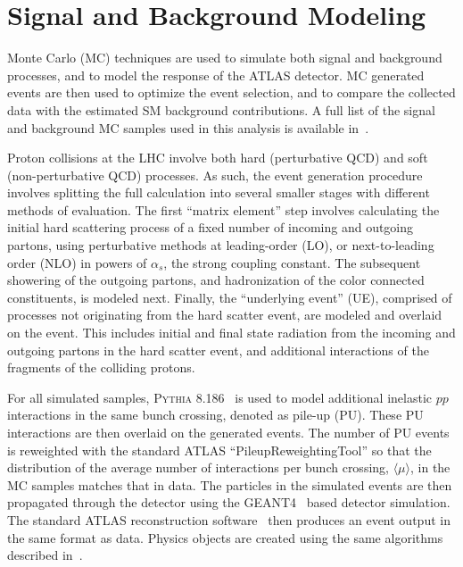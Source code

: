 %
\section{Signal and Background Modeling}
\label{ch:analysisStrategy:sig_bkg_model}
Monte Carlo (MC) techniques are used to simulate both signal and background processes, and to model the response of the ATLAS detector. MC generated events are then used to optimize the event selection, and to compare the collected data with the estimated SM background contributions. A full list of the signal and background MC samples used in this analysis is available in~\App{\ref{ch:samples}}.

Proton collisions at the LHC involve both hard (perturbative QCD) and soft (non-perturbative QCD) processes. As such, the event generation procedure involves splitting the full calculation into several smaller stages with different methods of evaluation. The first ``matrix element'' step involves calculating the initial hard scattering process of a fixed number of incoming and outgoing partons, using perturbative methods at leading-order (LO), or next-to-leading order (NLO) in powers of $\alpha_s$, the strong coupling constant. The subsequent showering of the outgoing partons, and hadronization of the color connected constituents, is modeled next. Finally, the ``underlying event'' (UE), comprised of processes not originating from the hard scatter event, are modeled and overlaid on the event. This includes initial and final state radiation from the incoming and outgoing partons in the hard scatter event, and additional interactions of the fragments of the colliding protons.

For all simulated samples, \textsc{Pythia} 8.186~\cite{pythia8} is used to model additional inelastic $pp$ interactions in the same bunch crossing, denoted as pile-up (PU). These PU interactions are then overlaid on the generated events. The number of PU events is reweighted with the standard ATLAS ``PileupReweightingTool'' so that the distribution of the average number of interactions per bunch crossing, $\langle\mu\rangle$, in the MC samples matches that in data. The particles in the simulated events are then propagated through the detector using the \textsc{GEANT4}~\cite{geant4} based detector simulation. The standard ATLAS reconstruction software~\cite{atlas_sim} then produces an event output in the same format as data. Physics objects are created using the same algorithms described in~\Ch{\ref{ch:objreco}}.


